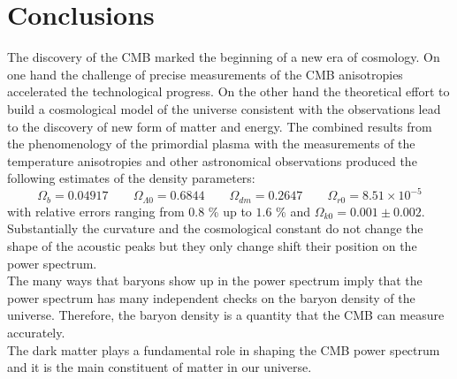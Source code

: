 \documentclass{article}
\begin{document}
\section{Conclusions}
The discovery of the CMB marked the beginning of a new era of cosmology.
On one hand the challenge of precise measurements of the CMB anisotropies accelerated the technological progress.
On the other hand the theoretical effort to build a cosmological model of the universe consistent with the observations lead to the discovery of new form of matter and energy.
The combined results from the phenomenology of the primordial plasma with the measurements of the temperature anisotropies and other astronomical observations produced the following estimates of the density parameters:
\begin{equation*}
    \Omega_{b} = 0.04917 
\qquad \Omega_{\Lambda 0} = 0.6844 \qquad \Omega_{dm} = 0.2647
\qquad \Omega_{r0} = 8.51 \times 10^{-5} 
\end{equation*}
with relative errors ranging from $0.8$ \% up to $1.6$ \% and $\Omega_{k0} = 0.001 \pm 0.002$.\\
Substantially the curvature and the cosmological constant do not change the shape of the acoustic peaks but they only change shift their position on the power spectrum.\\
The many ways that baryons show up in the power spectrum imply that the power spectrum has many independent checks on the baryon density of the universe.  
Therefore, the baryon density is a quantity that the CMB can measure accurately.\\
The dark matter plays a fundamental role in shaping the CMB power spectrum and it is the main constituent of matter in our universe.



\nocite{*}



\end{document}
